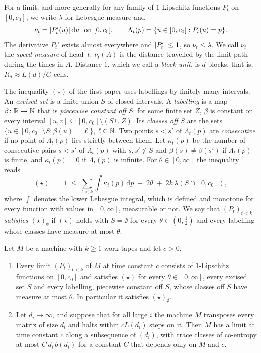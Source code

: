 For a limit, and more generally for any family of $1$-Lipschitz functions $P_t$ on $[0,c_0]$, we write $\lambda$ for
Lebesgue measure and
\[
  \nu_t=\lvert P_t'(u) \rvert\,\mathrm du\ \text{ on }[0,c_0],\qquad
  \Lambda_t(p)=\{u\in[0,c_0]:P_t(u)=p\}.
\]
The derivative $P_t'$ exists almost everywhere and $\lvert P_t' \rvert\le1$, so $\nu_t\le\lambda$. We call $\nu_t$ the
\emph{speed measure} of head~$t$: $\nu_t(A)$ is the distance travelled by the limit path during the times in $A$.
Distance $1$, which we call a \emph{block unit}, is $d$ blocks, that is, $R_d\approx L(d)/G$ cells.

The inequality $(\star)$ of the first paper uses labellings by finitely many intervals. An \emph{excised set} is a
finite union $S$ of closed intervals. A \emph{labelling} is a map $\beta\colon\mathbb{R}\to\mathbb{N}$ that is \emph{piecewise constant
off $S$}: for some finite set $Z$, $\beta$ is constant on every interval $[u,v]\subseteq[0,c_0]\setminus(S\cup Z)$. Its
\emph{classes off $S$} are the sets $\{u\in[0,c_0]\setminus S:\beta(u)=\ell\}$, $\ell\in\mathbb{N}$. Two points $s<s'$ of
$\Lambda_t(p)$ are \emph{consecutive} if no point of $\Lambda_t(p)$ lies strictly between them. Let $\kappa_t(p)$ be the
number of consecutive pairs $s<s'$ of $\Lambda_t(p)$ with $s,s'\notin S$ and $\beta(s)\ne\beta(s')$ if $\Lambda_t(p)$ is
finite, and $\kappa_t(p)=0$ if $\Lambda_t(p)$ is infinite. For $\theta\in[0,\infty]$ the inequality reads
\[
  (\star)\qquad 1\;\le\;\sum_{t<k}\int\kappa_t(p)\,\mathrm dp\;+\;2\theta\;+\;2k\,\lambda(S\cap[0,c_0]),
\]
where $\int$ denotes the lower Lebesgue integral, which is defined and monotone for every function with values in
$[0,\infty]$, measurable or not. We say that $(P_t)_{t<k}$ \emph{satisfies $(\star)_\emptyset$} if $(\star)$ holds with
$S=\emptyset$ for every $\theta\in(0,\frac12)$ and every labelling whose classes have measure at most $\theta$.

\begin{theorem}\label{thm:Mstar}
Let $M$ be a machine with $k\ge1$ work tapes and let $c>0$.
\begin{enumerate}[label=(\alph*)]
\item Every limit $(P_t)_{t<k}$ of $M$ at time constant $c$ consists of $1$-Lipschitz functions on $[0,c_0]$ and
satisfies $(\star)$ for every $\theta\in[0,\infty]$, every excised set $S$ and every labelling, piecewise
constant off $S$, whose classes off $S$ have measure at most $\theta$. In particular it satisfies $(\star)_\emptyset$.
\item Let $d_i\to\infty$, and suppose that for all large $i$ the machine $M$ transposes every matrix of size $d_i$ and
halts within $cL(d_i)$ steps on it. Then $M$ has a limit at time constant $c$ along a subsequence of $(d_i)$, with trace
classes of co-entropy at most $C\,d_i\,b(d_i)$ for a constant $C$ that depends only on $M$ and $c$.
\end{enumerate}
\end{theorem}

